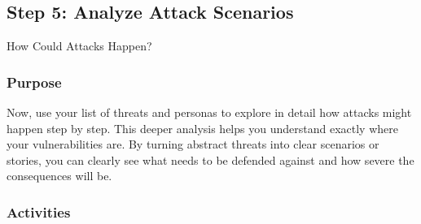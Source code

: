 \subsection{Step 5: Analyze Attack Scenarios}
\label{subsec:Step5}

How Could Attacks Happen?

\subsubsection{Purpose}

Now, use your list of threats and personas to explore in detail how attacks
might happen step by step. This deeper analysis helps you understand exactly
where your vulnerabilities are. By turning abstract threats into clear scenarios
or stories, you can clearly see what needs to be defended against and how severe
the consequences will be.

\subsubsection{Activities}

